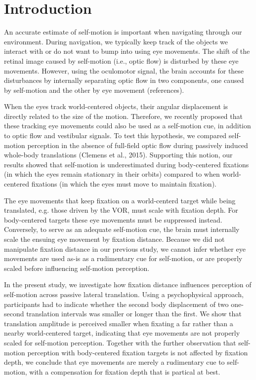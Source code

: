 \section{Introduction}

An accurate estimate of self-motion is important when navigating through our environment. During navigation, we typically keep track of the objects we interact with or do not want to bump into using eye movements. The shift of the retinal image caused by self-motion (i.e., optic flow) is disturbed by these eye movements. However, using the oculomotor signal, the brain accounts for these disturbances by internally separating optic flow in two components, one caused by self-motion and the other by eye movement (references).

When the eyes track world-centered objects, their angular displacement is directly related to the size of the motion. Therefore, we recently proposed that these tracking eye movements could also be used as a self-motion cue, in addition to optic flow and vestibular signals. To test this hypothesis, we compared self-motion perception in the absence of full-field optic flow during passively induced whole-body translations (Clemens et al., 2015). Supporting this notion, our results showed that self-motion is underestimated during body-centered fixations (in which the eyes remain stationary in their orbits) compared to when world-centered fixations (in which the eyes must move to maintain fixation).

The eye movements that keep fixation on a world-centerd target while being translated, e.g. those driven by the VOR, must scale with fixation depth. For body-centered targets these eye movements must be suppressed instead. Conversely, to serve as an adequate self-motion cue, the brain must internally scale the ensuing eye movement by fixation distance. Because we did not manipulate fixation distance in our previous study, we cannot infer whether eye movements are used as-is as a rudimentary cue for self-motion, or are properly scaled before influencing self-motion perception.

In the present study, we investigate how fixation distance influences perception of self-motion across passive lateral translation. Using a psychophysical approach, participants had to indicate whether the second body displacement of two one-second translation intervals was smaller or longer than the first. We show that translation amplitude is perceived smaller when fixating a far rather than a nearby world-centered target, indicating that eye movements are not properly scaled for self-motion perception. Together with the further observation that self-motion perception with body-centered fixation targets is not affected by fixation depth, we conclude that eye movements are merely a rudimentary cue to self-motion, with a compensation for fixation depth that is partical at best.